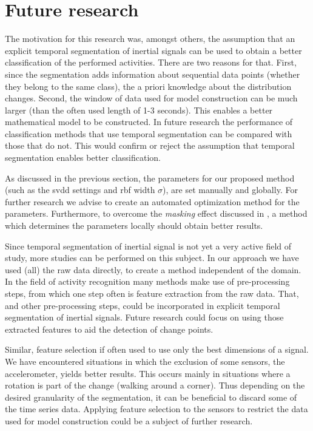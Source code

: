\section{Future research}\label{sec:further_research}
The motivation for this research was, amongst others, the assumption that an explicit temporal segmentation of inertial signals can be used to obtain a better classification of the performed activities.
There are two reasons for that.
First, since the segmentation adds information about sequential data points (whether they belong to the same class), the a priori knowledge about the distribution changes.
Second, the window of data used for model construction can be much larger (than the often used length of 1-3 seconds).
This enables a better mathematical model to be constructed.
In future research the performance of classification methods that use temporal segmentation can be compared with those that do not.
This would confirm or reject the assumption that temporal segmentation enables better classification.

As discussed in the previous section, the parameters for our proposed method (such as the \gls{svdd} settings and \gls{rbf} width $\sigma$), are set manually and globally.
For further research we advise to create an automated optimization method for the parameters.
Furthermore, to overcome the \emph{masking} effect discussed in , a method which determines the parameters locally should obtain better results.

Since temporal segmentation of inertial signal is not yet a very active field of study, more studies can be performed on this subject.
In our approach we have used (all) the raw data directly, to create a method independent of the domain.
In the field of activity recognition many methods make use of pre-processing steps, from which one step often is feature extraction from the raw data.
That, and other pre-processing steps, could be incorporated in explicit temporal segmentation of inertial signals.
Future research could focus on using those extracted features to aid the detection of change points.

Similar, feature selection if often used to use only the best dimensions of a signal.
We have encountered situations in which the exclusion of some sensors, \eg the accelerometer, yields better results.
This occurs mainly in situations where a rotation is part of the change (\eg walking around a corner).
Thus depending on the desired granularity of the segmentation, it can be beneficial to discard some of the time series data.
Applying feature selection to the sensors to restrict the data used for model construction could be a subject of further research.

